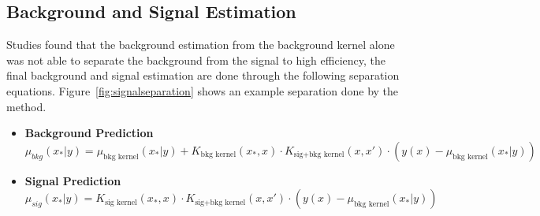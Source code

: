 \subsection{Background and Signal Estimation}
Studies found that the background estimation from the background kernel alone was not able to separate the background from the signal to high efficiency, the final background and signal estimation are done through the following separation equations. Figure~\ref{fig:signalseparation} shows an example separation done by the method.

\begin{itemize}
    \item \textbf{Background Prediction}
    \begin{equation}
        \mu_{bkg}(x_{*}|y) = \mu_{\textrm{bkg kernel}}(x_{*}|y)+K_{\textrm{bkg kernel}}(x_{*}, x) \cdot K_{\textrm{sig+bkg kernel}}(x,x') \cdot( y(x)-\mu_{\textrm{bkg kernel}}(x_{*}|y) )
    \end{equation}


    \item \textbf{Signal Prediction}
    \begin{equation}
        \mu_{sig}(x_{*}|y) = K_{\textrm{sig kernel}}(x_{*}, x)\cdot K_{\textrm{sig+bkg kernel}}(x,x') \cdot ( y(x)-\mu_{\textrm{bkg kernel}}(x_{*}|y) )
    \end{equation}

\end{itemize}

